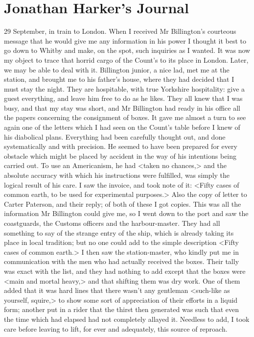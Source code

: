 \section{Jonathan Harker's Journal}

\begin{diary}{29 September, in train to London.}
When I received Mr Billington's courteous message that he would give me any information in his power I thought it best to go down to Whitby and make, on the spot, such inquiries as I wanted. It was now my object to trace that horrid cargo of the Count's to its place in London. Later, we may be able to deal with it. Billington junior, a nice lad, met me at the station, and brought me to his father's house, where they had decided that I must stay the night. They are hospitable, with true Yorkshire hospitality: give a guest everything, and leave him free to do as he likes. They all knew that I was busy, and that my stay was short, and Mr Billington had ready in his office all the papers concerning the consignment of boxes. It gave me almost a turn to see again one of the letters which I had seen on the Count's table before I knew of his diabolical plans. Everything had been carefully thought out, and done systematically and with precision. He seemed to have been prepared for every obstacle which might be placed by accident in the way of his intentions being carried out. To use an Americanism, he had <taken no chances,> and the absolute accuracy with which his instructions were fulfilled, was simply the logical result of his care. I saw the invoice, and took note of it: <Fifty cases of common earth, to be used for experimental purposes.> Also the copy of letter to Carter Paterson, and their reply; of both of these I got copies. This was all the information Mr Billington could give me, so I went down to the port and saw the coastguards, the Customs officers and the harbour-master. They had all something to say of the strange entry of the ship, which is already taking its place in local tradition; but no one could add to the simple description <Fifty cases of common earth.> I then saw the station-master, who kindly put me in communication with the men who had actually received the boxes. Their tally was exact with the list, and they had nothing to add except that the boxes were <main and mortal heavy,> and that shifting them was dry work. One of them added that it was hard lines that there wasn't any gentleman <such-like as yourself, squire,> to show some sort of appreciation of their efforts in a liquid form; another put in a rider that the thirst then generated was such that even the time which had elapsed had not completely allayed it. Needless to add, I took care before leaving to lift, for ever and adequately, this source of reproach.
\end{diary}
 

